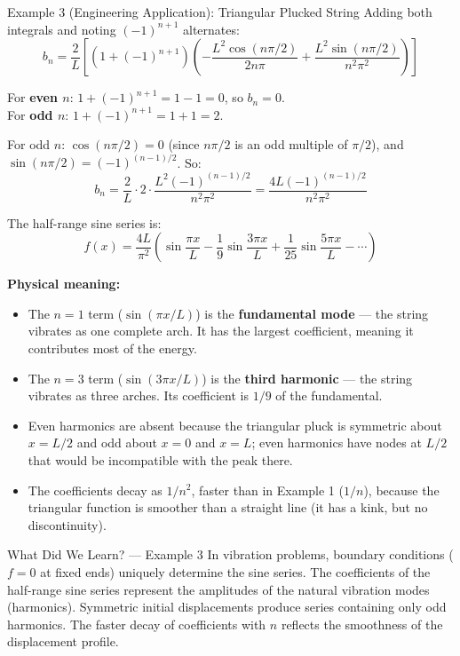 \documentclass[12pt,a4paper]{article}
\begin{document}
\begin{infobox}{Example 3 (Engineering Application): Triangular Plucked String}
Adding both integrals and noting $(-1)^{n+1}$ alternates:
\[
  b_n = \frac{2}{L}\left[(1+(-1)^{n+1})\left(-\frac{L^2\cos(n\pi/2)}{2n\pi} + \frac{L^2\sin(n\pi/2)}{n^2\pi^2}\right)\right]
\]

For \textbf{even $n$}: $1+(-1)^{n+1} = 1-1 = 0$, so $b_n = 0$.\\
For \textbf{odd $n$}: $1+(-1)^{n+1} = 1+1 = 2$.

For odd $n$: $\cos(n\pi/2) = 0$ (since $n\pi/2$ is an odd multiple of $\pi/2$), and $\sin(n\pi/2) = (-1)^{(n-1)/2}$. So:
\[
  b_n = \frac{2}{L}\cdot 2\cdot\frac{L^2(-1)^{(n-1)/2}}{n^2\pi^2} = \frac{4L(-1)^{(n-1)/2}}{n^2\pi^2}
\]

The half-range sine series is:
\[
  f(x) = \frac{4L}{\pi^2}\left(\sin\frac{\pi x}{L} - \frac{1}{9}\sin\frac{3\pi x}{L} + \frac{1}{25}\sin\frac{5\pi x}{L} - \cdots\right)
\]

\textbf{Physical meaning:}
\begin{itemize}[noitemsep]
  \item The $n=1$ term ($\sin(\pi x/L)$) is the \textbf{fundamental mode} --- the string vibrates as one complete arch. It has the largest coefficient, meaning it contributes most of the energy.
  \item The $n=3$ term ($\sin(3\pi x/L)$) is the \textbf{third harmonic} --- the string vibrates as three arches. Its coefficient is $1/9$ of the fundamental.
  \item Even harmonics are absent because the triangular pluck is symmetric about $x=L/2$ and odd about $x=0$ and $x=L$; even harmonics have nodes at $L/2$ that would be incompatible with the peak there.
  \item The coefficients decay as $1/n^2$, faster than in Example 1 ($1/n$), because the triangular function is smoother than a straight line (it has a kink, but no discontinuity).
\end{itemize}
\end{infobox}

\begin{learnbox}{What Did We Learn? --- Example 3}
In vibration problems, boundary conditions ($f=0$ at fixed ends) uniquely determine the sine series. The coefficients of the half-range sine series represent the amplitudes of the natural vibration modes (harmonics). Symmetric initial displacements produce series containing only odd harmonics. The faster decay of coefficients with $n$ reflects the smoothness of the displacement profile.
\end{learnbox}
\end{document}
